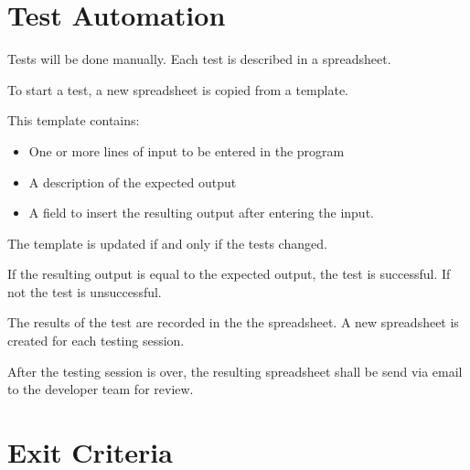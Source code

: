 \documentclass[11pt,a4paper]{article}
\begin{document}

\section{Test Automation}\label{sec:test-automation}

Tests will be done manually. Each test is described in a spreadsheet.

To start a test, a new spreadsheet is copied from a template.

This template contains:

\begin{itemize}
\item One or more lines of input to be entered in the program
\item A description of the expected output
\item A field to insert the resulting output after entering the input.
\end{itemize}

The template is updated if and only if the tests  changed.

If the resulting output is equal to the expected output, the test is
successful. If not the test is unsuccessful.

The results of the test are recorded in the the spreadsheet. A new
spreadsheet is created for each testing session.

After the testing session is over, the resulting spreadsheet shall be
send via email to the developer team for review.


\section{Exit Criteria}
\end{document}
